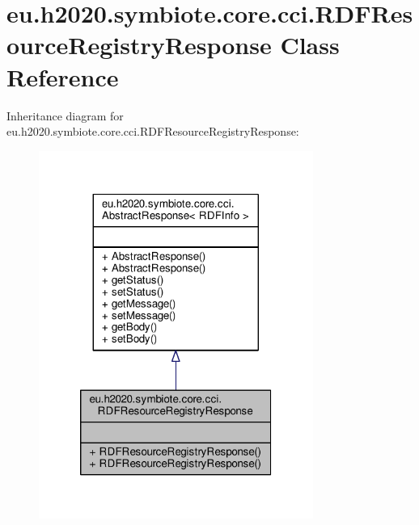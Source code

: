 \hypertarget{classeu_1_1h2020_1_1symbiote_1_1core_1_1cci_1_1RDFResourceRegistryResponse}{}\section{eu.\+h2020.\+symbiote.\+core.\+cci.\+R\+D\+F\+Resource\+Registry\+Response Class Reference}
\label{classeu_1_1h2020_1_1symbiote_1_1core_1_1cci_1_1RDFResourceRegistryResponse}


Inheritance diagram for eu.\+h2020.\+symbiote.\+core.\+cci.\+R\+D\+F\+Resource\+Registry\+Response\+:
\nopagebreak
\begin{figure}[H]
\begin{center}
\leavevmode
\includegraphics[width=254pt]{classeu_1_1h2020_1_1symbiote_1_1core_1_1cci_1_1RDFResourceRegistryResponse__inherit__graph}
\end{center}
\end{figure}


